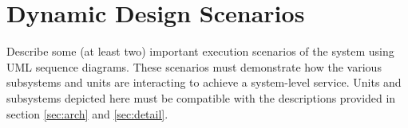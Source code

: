 \documentclass[12pt]{article}
\begin{document}
\section{Dynamic Design Scenarios}

Describe some (at least two) important execution scenarios of the system using UML sequence diagrams.
These scenarios must demonstrate how the various subsystems and units are interacting to achieve a system-level service.
Units and subsystems depicted here must be compatible with the descriptions provided in
section \ref{sec:arch} and \ref{sec:detail}.
\end{document}
